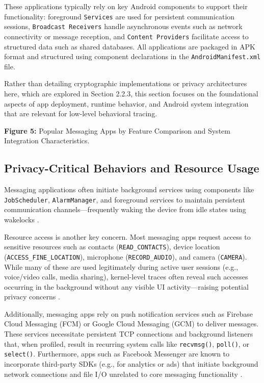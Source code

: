 \documentclass[a4paper,12pt]{report}
\begin{document}
These applications typically rely on key Android components to support their functionality: foreground \texttt{Services} are used for persistent communication sessions, \texttt{Broadcast Receivers} handle asynchronous events such as network connectivity or message reception, and \texttt{Content Providers} facilitate access to structured data such as shared databases. All applications are packaged in APK format and structured using component declarations in the \texttt{AndroidManifest.xml} file.

Rather than detailing cryptographic implementations or privacy architectures here, which are explored in Section 2.2.3, this section focuses on the foundational aspects of app deployment, runtime behavior, and Android system integration that are relevant for low-level behavioral tracing.

\textbf{Figure 5:} Popular Messaging Apps by Feature Comparison and System Integration Characteristics.

\subsection{Privacy-Critical Behaviors and Resource Usage}
Messaging applications often initiate background services using components like \texttt{JobScheduler}, \texttt{AlarmManager}, and foreground services to maintain persistent communication channels—frequently waking the device from idle states using wakelocks \cite{androidwakelocks}.

Resource access is another key concern. Most messaging apps request access to sensitive resources such as contacts (\texttt{READ\_CONTACTS}), device location (\texttt{ACCESS\_FINE\_LOCATION}), microphone (\texttt{RECORD\_AUDIO}), and camera (\texttt{CAMERA}). While many of these are used legitimately during active user sessions (e.g., voice/video calls, media sharing), kernel-level traces often reveal such accesses occurring in the background without any visible UI activity—raising potential privacy concerns \cite{reardon2019leakage}.

Additionally, messaging apps rely on push notification services such as Firebase Cloud Messaging (FCM) or Google Cloud Messaging (GCM) to deliver messages. These services necessitate persistent TCP connections and background listeners that, when profiled, result in recurring system calls like \texttt{recvmsg()}, \texttt{poll()}, or \texttt{select()}. Furthermore, apps such as Facebook Messenger are known to incorporate third-party SDKs (e.g., for analytics or ads) that initiate background network connections and file I/O unrelated to core messaging functionality \cite{pi2018metadata}.
\end{document}
